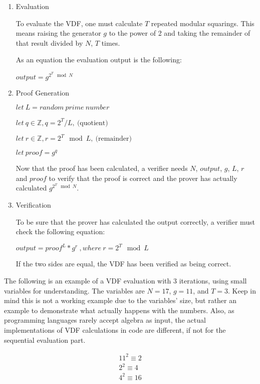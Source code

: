 \begin{enumerate}
	\item{Evaluation}

          To evaluate the VDF, one must calculate \(T\) repeated modular squarings. This means raising the generator $g$ to the power of 2 and taking the remainder of that result divided by $N$, $T$ times.

	      As an equation the evaluation output is the following:

	      \( output = g^{2^{T} \mod N } \)

	\item{Proof Generation}

	      \( let \: L = random \: prime \: number \)

	      \( let \: q \in \mathbb{Z}, q = 2^T/L, \: \text{(quotient)} \)

	      \( let \: r \in \mathbb{Z}, r = 2^T\mod L, \: \text{(remainder)} \)

	      \( let \: proof = g^q \)

	      Now that the proof has been calculated, a verifier needs $N$, $output$, $g$, $L$, $r$ and $proof$ to verify that the proof is correct and the prover has actually calculated $g^{2^{T} \mod N }$.

	\item{Verification}

	      To be sure that the prover has calculated the output correctly, a verifier must check the following equation:

	      \( output = proof^L * g^r \:, where \: r = 2^T \mod L \)

	      If the two sides are equal, the VDF has been verified as being correct.
\end{enumerate}

The following is an example of a VDF evaluation with 3 iterations, using small variables for understanding. The variables are \(N=17\), \(g=11\), and \(T=3\). Keep in mind this is not a working example due to the variables' size, but rather an example to demonstrate what actually happens with the numbers. Also, as programming languages rarely accept algebra as input, the actual implementations of VDF calculations in code are different, if not for the sequential evaluation part.

\begin{align*}
	11^2 \equiv 2\\
	2^2 \equiv 4\\
	4^2 \equiv 16\\
\end{align*}

